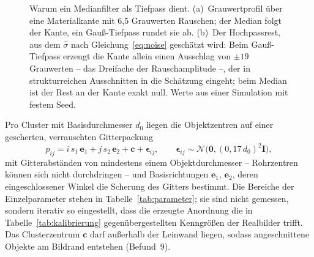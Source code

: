 \begin{figure}[htbp]
\caption[Rauschschätzung mit Medianfilter]{Warum ein Medianfilter als Tiefpass
dient. (a)~Grauwertprofil über eine Materialkante mit 6,5 Grauwerten Rauschen;
der Median folgt der Kante, ein Gauß-Tiefpass rundet sie ab. (b)~Der
Hochpassrest, aus dem $\hat\sigma$ nach Gleichung~\eqref{eq:noise} geschätzt
wird: Beim Gauß-Tiefpass erzeugt die Kante allein einen Ausschlag von $\pm19$
Grauwerten -- das Dreifache der Rauschamplitude --, der in strukturreichen
Ausschnitten in die Schätzung eingeht; beim Median ist der Rest an der Kante
exakt null. Werte aus einer Simulation mit festem Seed.}
\label{abb:rauschschaetzung}
\end{figure}

\fi

 Pro Cluster mit Basisdurchmesser $d_0$ liegen die
Objektzentren auf einer gescherten, verrauschten Gitterpackung
\begin{equation}
p_{ij} = i\,s_1\,\mathbf{e}_1 + j\,s_2\,\mathbf{e}_2 + \mathbf{c}
+ \boldsymbol{\epsilon}_{ij},
\qquad \boldsymbol{\epsilon}_{ij} \sim \mathcal{N}\!\big(\mathbf{0},
(0{,}17\,d_0)^2 \mathbf{I}\big),
\label{eq:layout}
\end{equation}
mit Gitterabständen von mindestens einem Objektdurchmesser -- Rohrzentren
können sich nicht durchdringen -- und Basisrichtungen $\mathbf{e}_1$,
$\mathbf{e}_2$, deren eingeschlossener Winkel die Scherung des Gitters bestimmt.
Die Bereiche der Einzelparameter stehen in Tabelle~\ref{tab:parameter}; sie sind
nicht gemessen, sondern iterativ so eingestellt, dass die erzeugte Anordnung die
in Tabelle~\ref{tab:kalibrierung} gegenübergestellten Kenngrößen der Realbilder
trifft. Das Clusterzentrum $\mathbf{c}$ darf außerhalb der
Leinwand liegen, sodass angeschnittene Objekte am Bildrand entstehen (Befund~9).

